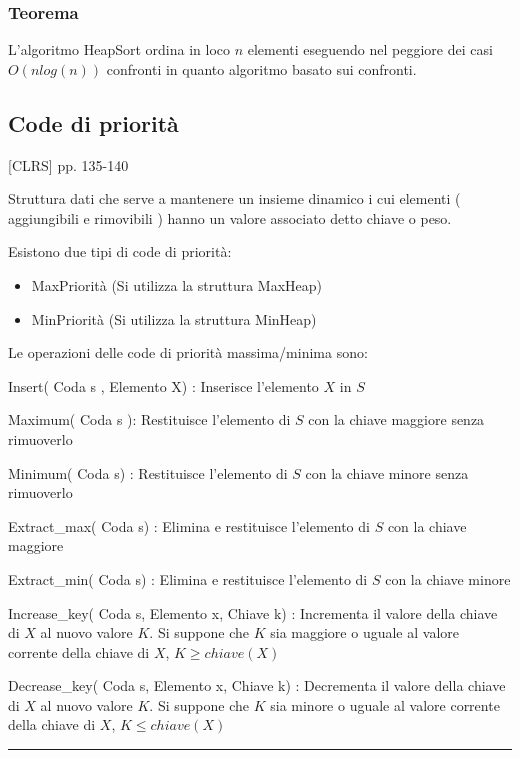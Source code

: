 \subsubsection{Teorema}

{L'algoritmo HeapSort ordina in loco $n$ elementi eseguendo nel peggiore dei casi $O(nlog(n))$ confronti in quanto algoritmo basato sui confronti.}

\subsection{Code di priorità}

{{[}CLRS{]} pp. 135-140}

{Struttura dati che serve a mantenere un insieme dinamico i cui elementi ( aggiungibili e rimovibili ) hanno un valore associato detto chiave o peso.}

{Esistono due tipi di code di priorità:}

\begin{itemize}
\tightlist
\item
  {MaxPriorità (Si utilizza la struttura MaxHeap)}
\item
  {MinPriorità (Si utilizza la struttura MinHeap)}
\end{itemize}

{Le operazioni delle code di priorità massima/minima sono:}

{Insert( Coda s , Elemento X) : Inserisce l'elemento $X$ in $S$}

{Maximum( Coda s ): Restituisce l'elemento di $S$ con la chiave maggiore senza rimuoverlo}

{Minimum( Coda s) : Restituisce l'elemento di $S$ con la chiave minore senza rimuoverlo}

{Extract\_max( Coda s) : Elimina e restituisce l'elemento di $S$ con la chiave maggiore}

{Extract\_min( Coda s) : Elimina e restituisce l'elemento di $S$ con la chiave minore}

{Increase\_key( Coda s, Elemento x, Chiave k) : Incrementa il valore della chiave di $X$ al nuovo valore $K$. Si suppone che $K$ sia maggiore o uguale al valore corrente della chiave di $X$, $K \geq chiave(X)$}

{Decrease\_key( Coda s, Elemento x, Chiave k) : Decrementa il valore della chiave di $X$ al nuovo valore $K$. Si suppone che $K$ sia minore o uguale al valore corrente della chiave di $X$, $K \leq chiave(X)$}

\begin{center}\rule{0.5\linewidth}{\linethickness}\end{center}

